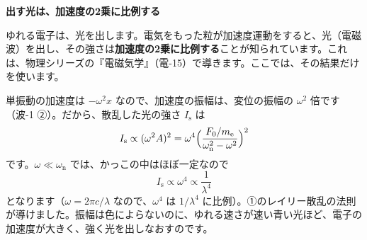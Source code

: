 \noindent\textbf{出す光は、加速度の2乗に比例する}\par\nobreak
ゆれる電子は、光を出します。電気をもった粒が加速度運動をすると、光（電磁波）を出し、その強さは\textbf{加速度の2乗に比例する}ことが知られています。これは、物理シリーズの『電磁気学』（電-15）で導きます。ここでは、その結果だけを使います。

単振動の加速度は $-\omega^2x$ なので、加速度の振幅は、変位の振幅の $\omega^2$ 倍です（波-1 ②）。だから、散乱した光の強さ $I_{\mathrm s}$ は
\[ I_{\mathrm s}\propto(\omega^2A)^2=\omega^4\Bigl(\frac{F_0/m_{\mathrm e}}{\omega_{\mathrm n}^2-\omega^2}\Bigr)^2 \]
です。$\omega\ll\omega_{\mathrm n}$ では、かっこの中はほぼ一定なので
\[ I_{\mathrm s}\propto\omega^4\propto\frac{1}{\lambda^4} \]
\label{ph:波-13:sanran}となります（$\omega=2\pi c/\lambda$ なので、$\omega^4$ は $1/\lambda^4$ に比例）。①のレイリー散乱の法則が導けました。振幅は色によらないのに、ゆれる速さが速い青い光ほど、電子の加速度が大きく、強く光を出しなおすのです。

\begin{phflow}[空の青さ]
\end{phflow}

